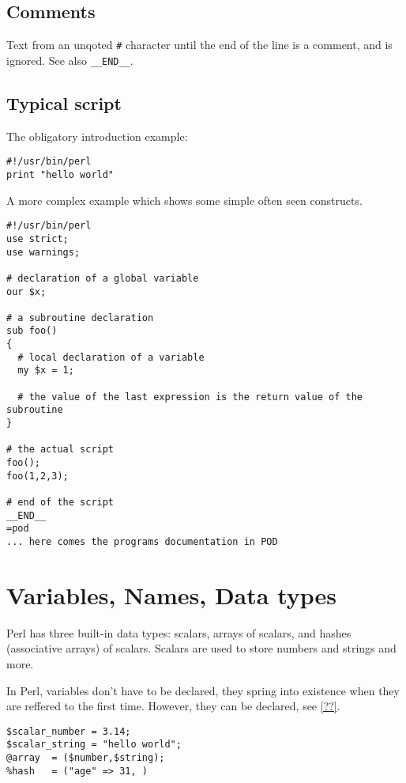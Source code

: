 \documentclass{article}
\begin{document}
\subsection{Comments}

Text from an unqoted \verb|#| character until the end of the line is a comment,
and is ignored. See also \verb|__END__|.

\subsection{Typical script}

The obligatory introduction example:

\begin{verbatim}
#!/usr/bin/perl
print "hello world"
\end{verbatim}

A more complex example which shows some simple often seen constructs.

\begin{verbatim}
#!/usr/bin/perl
use strict;
use warnings;

# declaration of a global variable
our $x; 

# a subroutine declaration
sub foo()
{
  # local declaration of a variable
  my $x = 1;    

  # the value of the last expression is the return value of the subroutine
}

# the actual script
foo(); 
foo(1,2,3);

# end of the script
__END__
=pod
... here comes the programs documentation in POD
\end{verbatim}


\section{Variables, Names, Data types}

Perl has three built-in data types: scalars, arrays of scalars, and hashes
(associative arrays) of scalars. Scalars are used to store numbers and strings
and more.

In Perl, variables don't have to be declared, they spring into existence when
they are reffered to the first time. However, they can be declared, see
\ref{??}.

\begin{verbatim}
$scalar_number = 3.14;
$scalar_string = "hello world";
@array  = ($number,$string);
%hash   = ("age" => 31, )
\end{verbatim}
\end{document}
